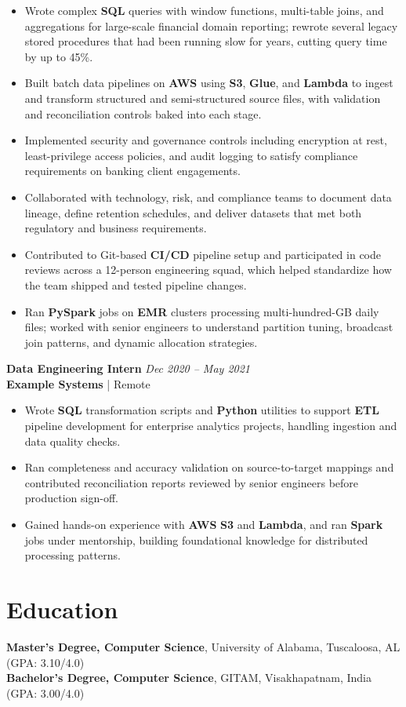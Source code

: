 \documentclass[\rFontPt pt,letterpaper]{extarticle}
\newcommand{\rEntryGap}{7.37pt}
\newcommand{\rEntryHead}[1]{\needspace{#1\baselineskip}}
\begin{document}
\begin{itemize}
\item Wrote complex \textbf{\mbox{SQL}} queries with window functions, multi-table joins, and aggregations for large-scale financial domain reporting; rewrote several legacy stored procedures that had been running slow for years, cutting query time by up to 45\%.
\item Built batch data pipelines on \textbf{\mbox{AWS}} using \textbf{\mbox{S3}}, \textbf{\mbox{Glue}}, and \textbf{\mbox{Lambda}} to ingest and transform structured and semi-structured source files, with validation and reconciliation controls baked into each stage.
\item Implemented security and governance controls including encryption at rest, least-privilege access policies, and audit logging to satisfy compliance requirements on banking client engagements.
\item Collaborated with technology, risk, and compliance teams to document data lineage, define retention schedules, and deliver datasets that met both regulatory and business requirements.
\item Contributed to \mbox{Git}-based \textbf{\mbox{CI/CD}} pipeline setup and participated in code reviews across a 12-person engineering squad, which helped standardize how the team shipped and tested pipeline changes.
\item Ran \textbf{\mbox{PySpark}} jobs on \textbf{\mbox{EMR}} clusters processing multi-hundred-GB daily files; worked with senior engineers to understand partition tuning, broadcast join patterns, and dynamic allocation strategies.
\end{itemize}
\vspace{\rEntryGap}
\rEntryHead{4}
\textbf{Data Engineering Intern} \hfill \textit{Dec 2020 -- May 2021}\\
\textbf{Example Systems} | Remote
\vspace{0pt}
\begin{itemize}
\item Wrote \textbf{\mbox{SQL}} transformation scripts and \textbf{\mbox{Python}} utilities to support \textbf{\mbox{ETL}} pipeline development for enterprise analytics projects, handling ingestion and data quality checks.
\item Ran completeness and accuracy validation on source-to-target mappings and contributed reconciliation reports reviewed by senior engineers before production sign-off.
\item Gained hands-on experience with \textbf{\mbox{AWS}} \textbf{\mbox{S3}} and \textbf{\mbox{Lambda}}, and ran \textbf{\mbox{Spark}} jobs under mentorship, building foundational knowledge for distributed processing patterns.
\end{itemize}

\section{Education}
\rEntryHead{1}
\textbf{Master's Degree, Computer Science}, University of Alabama, Tuscaloosa, AL \quad (GPA: 3.10/4.0)\\
\rEntryHead{1}
\textbf{Bachelor's Degree, Computer Science}, GITAM, Visakhapatnam, India \quad (GPA: 3.00/4.0)
\end{document}
